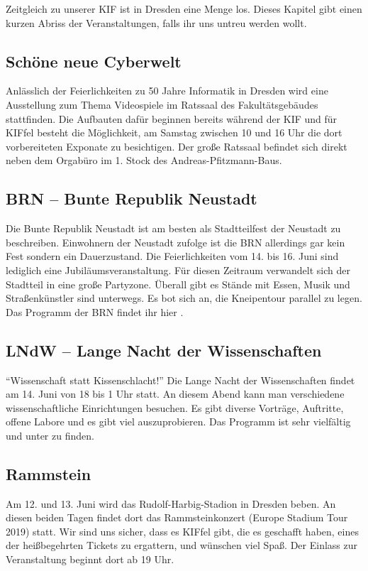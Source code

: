 Zeitgleich zu unserer KIF ist in Dresden eine Menge los. Dieses Kapitel gibt einen kurzen Abriss der Veranstaltungen, falls ihr uns untreu werden wollt.

\subsection*{Schöne neue Cyberwelt}
Anlässlich der Feierlichkeiten zu 50 Jahre Informatik in Dresden wird eine Ausstellung zum Thema Videospiele im Ratssaal des Fakultätsgebäudes stattfinden.
Die Aufbauten dafür beginnen bereits während der KIF und für KIFfel besteht die Möglichkeit, am Samstag zwischen 10 und 16 Uhr die dort vorbereiteten Exponate zu besichtigen.
Der große Ratssaal befindet sich direkt neben dem Orgabüro im 1. Stock des Andreas-Pfitzmann-Baus.


\subsection*{BRN -- Bunte Republik Neustadt}
Die Bunte Republik Neustadt ist am besten als Stadtteilfest der Neustadt zu beschreiben.
Einwohnern der Neustadt zufolge ist die BRN allerdings gar kein Fest sondern ein Dauerzustand.
Die Feierlichkeiten vom 14. bis 16. Juni sind lediglich eine Jubiläumsveranstaltung.
Für diesen Zeitraum verwandelt sich der Stadtteil in eine große Partyzone.
Überall gibt es Stände mit Essen, Musik und Straßenkünstler sind unterwegs.
Es bot sich an, die Kneipentour parallel zu legen.
Das Programm der BRN findet ihr hier .

\subsection*{LNdW -- Lange Nacht der Wissenschaften}
\enquote{Wissenschaft statt Kissenschlacht!}
 Die Lange Nacht der Wissenschaften findet am 14. Juni von 18 bis 1 Uhr statt.
An diesem Abend kann man verschiedene wissenschaftliche Einrichtungen besuchen.
Es gibt diverse Vorträge, Auftritte, offene Labore und es gibt viel auszuprobieren.
Das Programm ist sehr vielfältig und unter  zu finden.

\subsection*{Rammstein}
Am 12. und 13. Juni wird das Rudolf-Harbig-Stadion in Dresden beben.
An diesen beiden Tagen findet dort das Rammsteinkonzert (Europe Stadium Tour 2019) statt.
Wir sind uns sicher, dass es KIFfel gibt, die es geschafft haben, eines der heißbegehrten Tickets zu ergattern, und wünschen viel Spaß.
Der Einlass zur Veranstaltung beginnt dort ab 19 Uhr.

